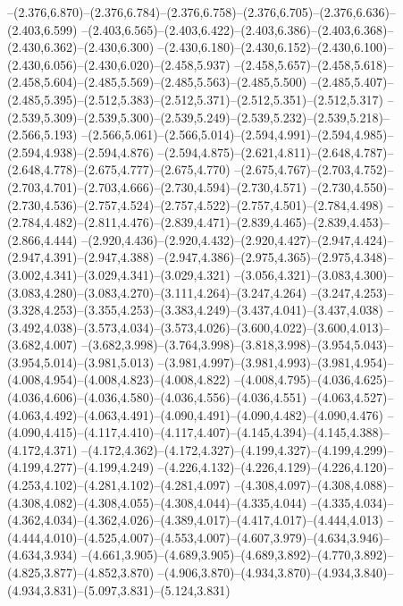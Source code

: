   --(2.376,6.870)--(2.376,6.784)--(2.376,6.758)--(2.376,6.705)--(2.376,6.636)--(2.403,6.599)%
  --(2.403,6.565)--(2.403,6.422)--(2.403,6.386)--(2.403,6.368)--(2.430,6.362)--(2.430,6.300)%
  --(2.430,6.180)--(2.430,6.152)--(2.430,6.100)--(2.430,6.056)--(2.430,6.020)--(2.458,5.937)%
  --(2.458,5.657)--(2.458,5.618)--(2.458,5.604)--(2.485,5.569)--(2.485,5.563)--(2.485,5.500)%
  --(2.485,5.407)--(2.485,5.395)--(2.512,5.383)--(2.512,5.371)--(2.512,5.351)--(2.512,5.317)%
  --(2.539,5.309)--(2.539,5.300)--(2.539,5.249)--(2.539,5.232)--(2.539,5.218)--(2.566,5.193)%
  --(2.566,5.061)--(2.566,5.014)--(2.594,4.991)--(2.594,4.985)--(2.594,4.938)--(2.594,4.876)%
  --(2.594,4.875)--(2.621,4.811)--(2.648,4.787)--(2.648,4.778)--(2.675,4.777)--(2.675,4.770)%
  --(2.675,4.767)--(2.703,4.752)--(2.703,4.701)--(2.703,4.666)--(2.730,4.594)--(2.730,4.571)%
  --(2.730,4.550)--(2.730,4.536)--(2.757,4.524)--(2.757,4.522)--(2.757,4.501)--(2.784,4.498)%
  --(2.784,4.482)--(2.811,4.476)--(2.839,4.471)--(2.839,4.465)--(2.839,4.453)--(2.866,4.444)%
  --(2.920,4.436)--(2.920,4.432)--(2.920,4.427)--(2.947,4.424)--(2.947,4.391)--(2.947,4.388)%
  --(2.947,4.386)--(2.975,4.365)--(2.975,4.348)--(3.002,4.341)--(3.029,4.341)--(3.029,4.321)%
  --(3.056,4.321)--(3.083,4.300)--(3.083,4.280)--(3.083,4.270)--(3.111,4.264)--(3.247,4.264)%
  --(3.247,4.253)--(3.328,4.253)--(3.355,4.253)--(3.383,4.249)--(3.437,4.041)--(3.437,4.038)%
  --(3.492,4.038)--(3.573,4.034)--(3.573,4.026)--(3.600,4.022)--(3.600,4.013)--(3.682,4.007)%
  --(3.682,3.998)--(3.764,3.998)--(3.818,3.998)--(3.954,5.043)--(3.954,5.014)--(3.981,5.013)%
  --(3.981,4.997)--(3.981,4.993)--(3.981,4.954)--(4.008,4.954)--(4.008,4.823)--(4.008,4.822)%
  --(4.008,4.795)--(4.036,4.625)--(4.036,4.606)--(4.036,4.580)--(4.036,4.556)--(4.036,4.551)%
  --(4.063,4.527)--(4.063,4.492)--(4.063,4.491)--(4.090,4.491)--(4.090,4.482)--(4.090,4.476)%
  --(4.090,4.415)--(4.117,4.410)--(4.117,4.407)--(4.145,4.394)--(4.145,4.388)--(4.172,4.371)%
  --(4.172,4.362)--(4.172,4.327)--(4.199,4.327)--(4.199,4.299)--(4.199,4.277)--(4.199,4.249)%
  --(4.226,4.132)--(4.226,4.129)--(4.226,4.120)--(4.253,4.102)--(4.281,4.102)--(4.281,4.097)%
  --(4.308,4.097)--(4.308,4.088)--(4.308,4.082)--(4.308,4.055)--(4.308,4.044)--(4.335,4.044)%
  --(4.335,4.034)--(4.362,4.034)--(4.362,4.026)--(4.389,4.017)--(4.417,4.017)--(4.444,4.013)%
  --(4.444,4.010)--(4.525,4.007)--(4.553,4.007)--(4.607,3.979)--(4.634,3.946)--(4.634,3.934)%
  --(4.661,3.905)--(4.689,3.905)--(4.689,3.892)--(4.770,3.892)--(4.825,3.877)--(4.852,3.870)%
  --(4.906,3.870)--(4.934,3.870)--(4.934,3.840)--(4.934,3.831)--(5.097,3.831)--(5.124,3.831)%

